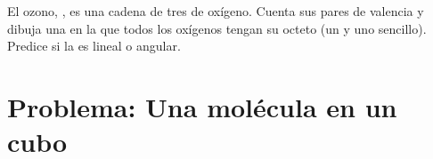 \begin{exercise}[$\star\star\star$]\label{exo:g10:lewis-and-shape:15}
El ozono, , es una cadena de tres  de oxígeno. Cuenta sus
pares de valencia y dibuja una  en la que todos los
oxígenos tengan su octeto (un  y uno sencillo). Predice si la
 es lineal o angular.
\end{exercise}

\section{Problema: Una molécula en un cubo}

